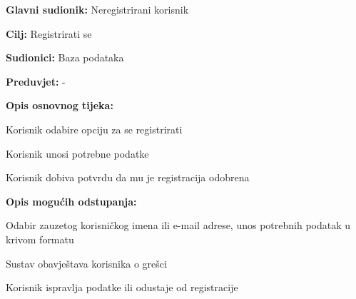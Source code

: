					\noindent {}
					\begin{packed_item}
	
						\item \textbf{Glavni sudionik: } Neregistrirani korisnik
						\item  \textbf{Cilj:} Registrirati se
						\item  \textbf{Sudionici:} Baza podataka
						\item  \textbf{Preduvjet:} -
						\item  \textbf{Opis osnovnog tijeka:}
						
						\item[] \begin{packed_enum}
	
							\item Korisnik odabire opciju za se registrirati
							\item Korisnik unosi potrebne podatke
							\item Korisnik dobiva potvrdu da mu je registracija odobrena
						\end{packed_enum}
						
						\item  \textbf{Opis mogućih odstupanja:}
						
						\item[] \begin{packed_item}
	
							\item[2.a] Odabir zauzetog korisničkog imena ili e-mail adrese, unos potrebnih podatak u krivom formatu
							\item[] \begin{packed_enum}
								
								\item Sustav obavještava korisnika o grešci
								\item Korisnik ispravlja podatke ili odustaje od registracije
								
							\end{packed_enum}
							
						\end{packed_item}
					\end{packed_item}
				
				
				
